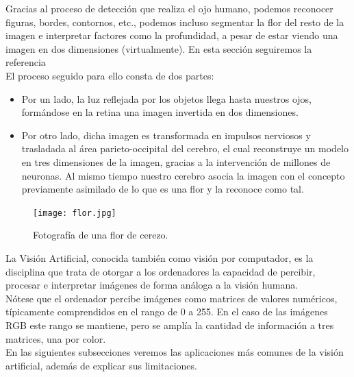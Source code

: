 \documentclass[a4paper,11pt]{article}
\begin{document}
\noindent
Gracias al proceso de detección que realiza el ojo humano, podemos reconocer figuras, bordes, contornos, etc., podemos incluso segmentar la flor del resto de la imagen e interpretar factores como la profundidad, a pesar de estar viendo una imagen en dos dimensiones (virtualmente). En esta sección seguiremos la referencia \cite{otrocurso}\\

\noindent
El proceso seguido para ello consta de dos partes:
\begin{itemize}
\item Por un lado, la luz reflejada por los objetos llega hasta nuestros ojos, formándose en la retina una imagen invertida en dos
dimensiones. 
\item Por otro lado, dicha imagen es transformada en impulsos nerviosos y trasladada al área parieto-occipital del cerebro, 
el cual reconstruye un modelo en tres dimensiones de la imagen, gracias a la intervención de millones de neuronas. Al mismo tiempo nuestro cerebro asocia la imagen con el concepto previamente asimilado de lo que es una flor y la reconoce como tal.
\end{itemize}

\begin{figure}[H]
\centering
\texttt{[image: flor.jpg]}
\caption{Fotografía de una flor de cerezo.}
\end{figure}
\noindent
La Visión Artificial, conocida también como visión por computador, es la disciplina que trata de otorgar a los ordenadores la capacidad de percibir, procesar  e interpretar imágenes de forma análoga a la visión humana. \\Nótese que el ordenador percibe imágenes como matrices de valores numéricos, típicamente comprendidos en el rango de 0 a 255. En el caso de las imágenes RGB este rango se mantiene, pero se amplía la cantidad de información a tres matrices, una por color.\\

\noindent
En las siguientes subsecciones veremos las aplicaciones más comunes de la visión artificial, además de explicar sus limitaciones.
\end{document}
